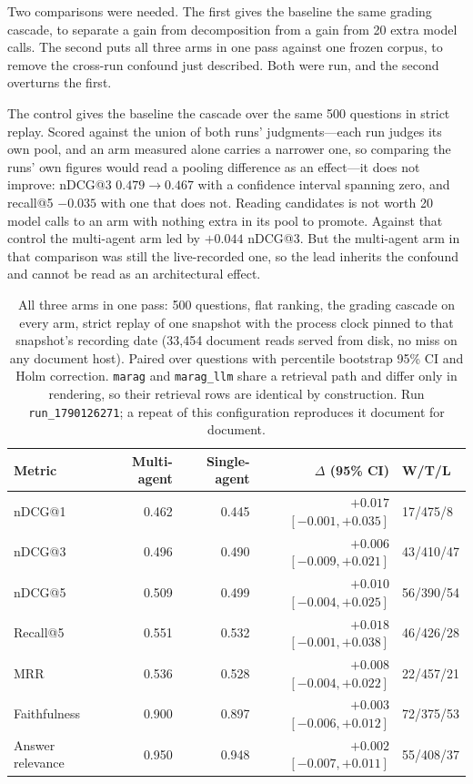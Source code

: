 \documentclass[acmsmall,review,anonymous,screen]{acmart}
\begin{document}
Two comparisons were needed. The first gives the baseline the same grading
cascade, to separate a gain from decomposition from a gain from 20 extra model
calls. The second puts all three arms in one pass against one frozen corpus, to
remove the cross-run confound just described. Both were run, and the second
overturns the first.

The control gives the baseline the cascade over the same 500 questions in
strict replay. Scored against the union of both runs' judgments---each run
judges its own pool, and an arm measured alone carries a narrower one, so
comparing the runs' own figures would read a pooling difference as an
effect---it does not improve: nDCG@3 $0.479 \to 0.467$ with a confidence
interval spanning zero, and recall@5 $-0.035$ with one that does not. Reading
candidates is not worth 20 model calls to an arm with nothing extra in its pool
to promote. Against that control the multi-agent arm led by $+0.044$ nDCG@3.
But the multi-agent arm in that comparison was still the live-recorded one, so
the lead inherits the confound and cannot be read as an architectural effect.

\begin{table}[t]
\caption{All three arms in one pass: 500 questions, flat ranking, the grading
cascade on every arm, strict replay of one snapshot with the process clock
pinned to that snapshot's recording date (33{,}454 document reads served from
disk, no miss on any document host). Paired over questions with percentile
bootstrap 95\% CI and Holm correction. \texttt{marag} and \texttt{marag\_llm}
share a retrieval path and differ only in rendering, so their retrieval rows
are identical by construction. Run \texttt{run\_1790126271}; a repeat of this
configuration reproduces it document for document.}
\label{tab:tier-control}
\begin{tabular}{lrrrl}
\toprule
Metric & Multi-agent & Single-agent & $\Delta$ (95\% CI) & W/T/L \\
\midrule
nDCG@1   & 0.462 & 0.445 & $+0.017$ $[-0.001, +0.035]$ & 17/475/8 \\
nDCG@3   & 0.496 & 0.490 & $+0.006$ $[-0.009, +0.021]$ & 43/410/47 \\
nDCG@5   & 0.509 & 0.499 & $+0.010$ $[-0.004, +0.025]$ & 56/390/54 \\
Recall@5 & 0.551 & 0.532 & $+0.018$ $[-0.001, +0.038]$ & 46/426/28 \\
MRR      & 0.536 & 0.528 & $+0.008$ $[-0.004, +0.022]$ & 22/457/21 \\
\midrule
Faithfulness      & 0.900 & 0.897 & $+0.003$ $[-0.006, +0.012]$ & 72/375/53 \\
Answer relevance  & 0.950 & 0.948 & $+0.002$ $[-0.007, +0.011]$ & 55/408/37 \\
\bottomrule
\end{tabular}
\end{table}
\end{document}
